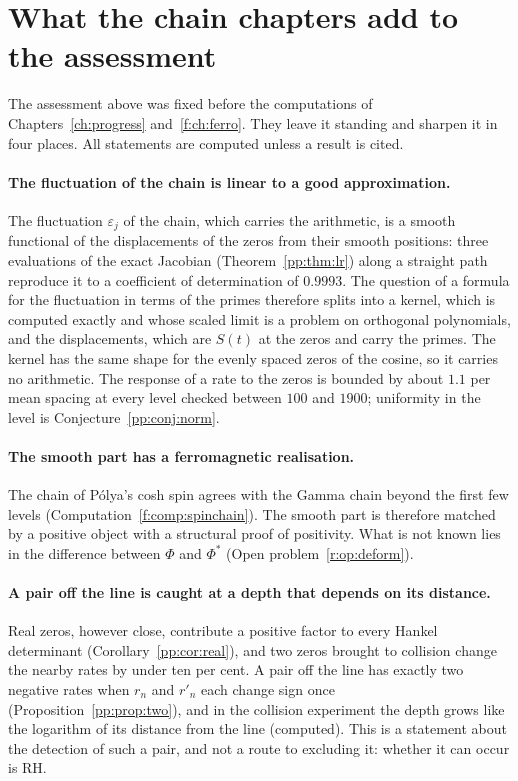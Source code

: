 \section{What the chain chapters add to the assessment}\label{fin:sec:later}

The assessment above was fixed before the computations of Chapters~\ref{ch:progress} and~\ref{f:ch:ferro}. They leave it standing and sharpen it in four places. All statements are computed unless a result is cited.

\paragraph{The fluctuation of the chain is linear to a good approximation.} The fluctuation $\varepsilon_j$ of the chain, which carries the arithmetic, is a smooth functional of the displacements of the zeros from their smooth positions: three evaluations of the exact Jacobian (Theorem~\ref{pp:thm:lr}) along a straight path reproduce it to a coefficient of determination of $0.9993$. The question of a formula for the fluctuation in terms of the primes therefore splits into a kernel, which is computed exactly and whose scaled limit is a problem on orthogonal polynomials, and the displacements, which are $S(t)$ at the zeros and carry the primes. The kernel has the same shape for the evenly spaced zeros of the cosine, so it carries no arithmetic. The response of a rate to the zeros is bounded by about $1.1$ per mean spacing at every level checked between $100$ and $1900$; uniformity in the level is Conjecture~\ref{pp:conj:norm}.

\paragraph{The smooth part has a ferromagnetic realisation.} The chain of P\'olya's cosh spin agrees with the Gamma chain beyond the first few levels (Computation~\ref{f:comp:spinchain}). The smooth part is therefore matched by a positive object with a structural proof of positivity. What is not known lies in the difference between $\Phi$ and $\Phi^*$ (Open problem~\ref{r:op:deform}).

\paragraph{A pair off the line is caught at a depth that depends on its distance.} Real zeros, however close, contribute a positive factor to every Hankel determinant (Corollary~\ref{pp:cor:real}), and two zeros brought to collision change the nearby rates by under ten per cent. A pair off the line has exactly two negative rates when $r_n$ and $r'_n$ each change sign once (Proposition~\ref{pp:prop:two}), and in the collision experiment the depth grows like the logarithm of its distance from the line (computed). This is a statement about the detection of such a pair, and not a route to excluding it: whether it can occur is RH.


